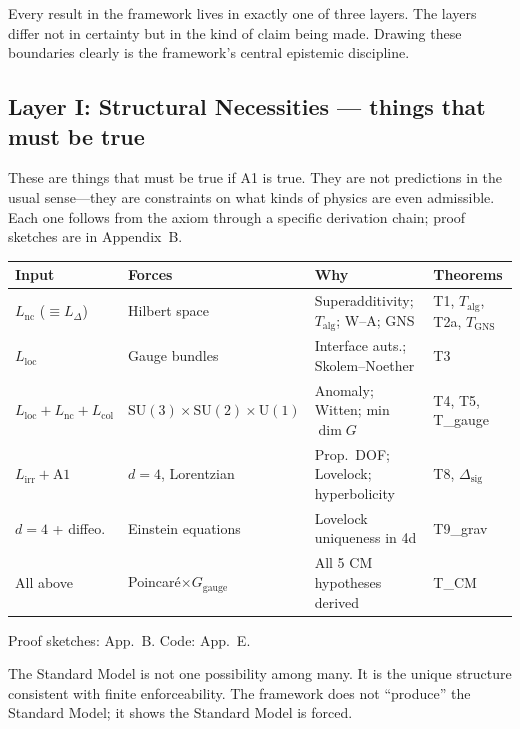 \documentclass[11pt]{article}
\newcommand{\SU}{\mathrm{SU}}
\newcommand{\U}{\mathrm{U}}
\begin{document}
Every result in the framework lives in exactly one of three layers.  The layers differ not in certainty but in the kind of claim being made.  Drawing these boundaries clearly is the framework's central epistemic discipline.

\subsection{Layer I: Structural Necessities --- things that must be true}

These are things that must be true if A1 is true.  They are not predictions in the usual sense---they are constraints on what kinds of physics are even admissible.  Each one follows from the axiom through a specific derivation chain; proof sketches are in Appendix~B.

\smallskip
\begin{center}
\small
\begin{tabular}{p{3.2cm}p{3.5cm}p{4.2cm}p{2.5cm}}
\toprule
\textbf{Input} & \textbf{Forces} & \textbf{Why} & \textbf{Theorems} \\
\midrule
$L_{\mathrm{nc}}$ ($\equiv L_\Delta$) & Hilbert space & Superadditivity; $T_{\mathrm{alg}}$; W--A; GNS & T1, $T_{\mathrm{alg}}$, T2a, $T_{\mathrm{GNS}}$ \\
$L_{\mathrm{loc}}$ & Gauge bundles & Interface auts.; Skolem--Noether & T3 \\
$L_{\mathrm{loc}}+L_{\mathrm{nc}}+L_{\mathrm{col}}$ & $\SU(3)\!\times\!\SU(2)\!\times\!\U(1)$ & Anomaly; Witten; min$\dim G$ & T4, T5, T\_gauge \\
$L_{\mathrm{irr}} + \text{A1}$ & $d{=}4$, Lorentzian & Prop.\ DOF; Lovelock; hyperbolicity & T8, $\Delta_{\mathrm{sig}}$ \\
$d{=}4$ + diffeo. & Einstein equations & Lovelock uniqueness in 4d & T9\_grav \\
All above & Poincar\'e$\times G_{\mathrm{gauge}}$ & All 5 CM hypotheses derived & T\_CM \\
\bottomrule
\end{tabular}
\end{center}
\smallskip

\noindent Proof sketches: App.~B.  Code: App.~E.

The Standard Model is not one possibility among many.  It is the unique structure consistent with finite enforceability.  The framework does not ``produce'' the Standard Model; it shows the Standard Model is forced.
\end{document}
